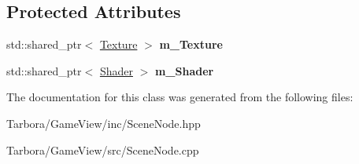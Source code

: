 \subsection*{Protected Attributes}
\begin{DoxyCompactItemize}
\item 
\mbox{\label{classTarbora_1_1MaterialNode_a74acc208d1b85cedc9f88f14a1cc87db}} 
std\+::shared\+\_\+ptr$<$ \hyperlink{classTarbora_1_1Texture}{Texture} $>$ {\bfseries m\+\_\+\+Texture}
\item 
\mbox{\label{classTarbora_1_1MaterialNode_ac974ea545195c373b5d59abf2605629c}} 
std\+::shared\+\_\+ptr$<$ \hyperlink{classTarbora_1_1Shader}{Shader} $>$ {\bfseries m\+\_\+\+Shader}
\end{DoxyCompactItemize}


The documentation for this class was generated from the following files\+:\begin{DoxyCompactItemize}
\item 
Tarbora/\+Game\+View/inc/Scene\+Node.\+hpp\item 
Tarbora/\+Game\+View/src/Scene\+Node.\+cpp\end{DoxyCompactItemize}

